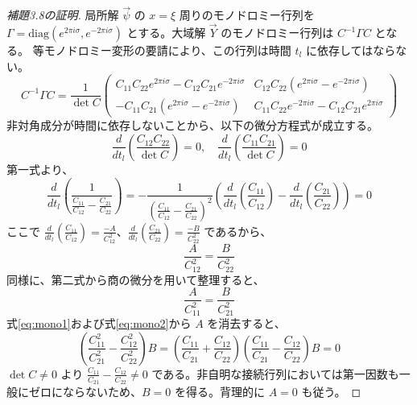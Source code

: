 \documentclass[paper=a4, fontsize=11pt]{jlreq} %
\newenvironment{story}{%
  \begin{mdframed}[
    backgroundcolor=red!5, %
    linewidth=0pt,         %
    innertopmargin=10pt,   %
    innerbottommargin=10pt,
    innerrightmargin=10pt, %
    innerleftmargin=10pt
  ]%
}{%
  \end{mdframed}%
}
\theoremstyle{break}
\theoremstyle{qa}
\begin{document}
\begin{story}
\begin{proof}[補題3.8の証明]
局所解 $\vec{\psi}$ の $x=\xi$ 周りのモノドロミー行列を $\Gamma = \mathrm{diag}(e^{2\pi i \sigma}, e^{-2\pi i \sigma})$ とする。大域解 $\vec{Y}$ のモノドロミー行列は $C^{-1}\Gamma C$ となる。
等モノドロミー変形の要請により、この行列は時間 $t_l$ に依存してはならない。
\begin{equation}
    C^{-1}\Gamma C = \frac{1}{\det C} 
    \begin{pmatrix} 
        C_{11}C_{22}e^{2\pi i \sigma} - C_{12}C_{21}e^{-2\pi i \sigma} & C_{12}C_{22}(e^{2\pi i \sigma} - e^{-2\pi i \sigma}) \\ 
        -C_{11}C_{21}(e^{2\pi i \sigma} - e^{-2\pi i \sigma}) & C_{11}C_{22}e^{-2\pi i \sigma} - C_{12}C_{21}e^{2\pi i \sigma} 
    \end{pmatrix}
\end{equation}
非対角成分が時間に依存しないことから、以下の微分方程式が成立する。
\begin{equation}
    \frac{d}{dt_l} \left( \frac{C_{12}C_{22}}{\det C} \right) = 0, \quad \frac{d}{dt_l} \left( \frac{C_{11}C_{21}}{\det C} \right) = 0
\end{equation}
第一式より、
\begin{equation*}
    \frac{d}{dt_l} \left( \frac{1}{\frac{C_{11}}{C_{12}} - \frac{C_{21}}{C_{22}}} \right) = -\frac{1}{\left(\frac{C_{11}}{C_{12}} - \frac{C_{21}}{C_{22}}\right)^2} \left( \frac{d}{dt_l}\left(\frac{C_{11}}{C_{12}}\right) - \frac{d}{dt_l}\left(\frac{C_{21}}{C_{22}}\right) \right) = 0
\end{equation*}
ここで $\frac{d}{dt_l}\left(\frac{C_{11}}{C_{12}}\right) = \frac{-A}{C_{12}^2}$、$\frac{d}{dt_l}\left(\frac{C_{21}}{C_{22}}\right) = \frac{-B}{C_{22}^2}$ であるから、
\begin{equation}
    \frac{A}{C_{12}^2} = \frac{B}{C_{22}^2} \label{eq:mono1}
\end{equation}
同様に、第二式から商の微分を用いて整理すると、
\begin{equation}
    \frac{A}{C_{11}^2} = \frac{B}{C_{21}^2} \label{eq:mono2}
\end{equation}
式\eqref{eq:mono1}および式\eqref{eq:mono2}から $A$ を消去すると、
\begin{equation}
    \left( \frac{C_{11}^2}{C_{21}^2} - \frac{C_{12}^2}{C_{22}^2} \right) B = \left( \frac{C_{11}}{C_{21}} + \frac{C_{12}}{C_{22}} \right) \left( \frac{C_{11}}{C_{21}} - \frac{C_{12}}{C_{22}} \right) B = 0
\end{equation}
$\det C \neq 0$ より $\frac{C_{11}}{C_{21}} - \frac{C_{12}}{C_{22}} \neq 0$ である。非自明な接続行列においては第一因数も一般にゼロにならないため、$B=0$ を得る。背理的に $A=0$ も従う。

\end{proof}
\end{story}
\end{document}
